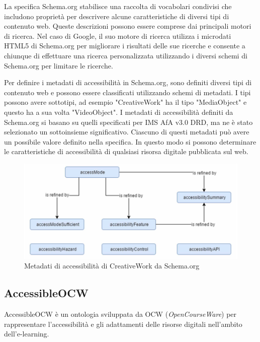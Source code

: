 La specifica Schema.org stabilisce una raccolta di vocabolari condivisi che includono proprietà per descrivere alcune caratteristiche di diversi tipi di contenuto web. Queste descrizioni possono essere comprese dai principali motori di ricerca. Nel caso di Google, il suo motore di ricerca utilizza i microdati HTML5 di Schema.org per migliorare i risultati delle sue ricerche e consente a chiunque di effettuare una ricerca personalizzata utilizzando i diversi schemi di Schema.org per limitare le ricerche.

Per definire i metadati di accessibilità in Schema.org, sono definiti diversi tipi di contenuto web e possono essere classificati utilizzando schemi di metadati.
I tipi possono avere sottotipi, ad esempio "CreativeWork" ha il tipo "MediaObject" e questo ha a sua volta "VideoObject".
I metadati di accessibilità definiti da Schema.org si basano su quelli specificati per IMS AfA v3.0 DRD, ma ne è stato selezionato un sottoinsieme significativo. Ciascuno di questi metadati può avere un possibile valore definito nella specifica. In questo modo si possono determinare le caratteristiche di accessibilità di qualsiasi risorsa digitale pubblicata sul web.

\begin{figure}[H]
\centering
\includegraphics[scale=0.7]{res/schemaorg.png}
\caption{Metadati di accessibilità di CreativeWork da Schema.org}
\label{fig:schemaorg}
\end{figure}

\subsection{AccessibleOCW}
AccessibleOCW è un ontologia sviluppata da OCW (\textit{OpenCourseWare}) per rappresentare l'accessibilità e gli adattamenti delle risorse digitali nell'ambito dell'e-learning.

